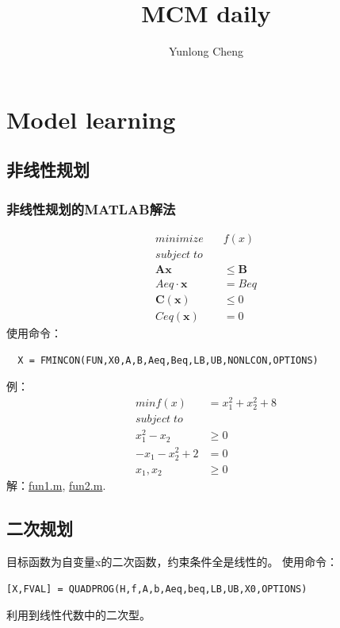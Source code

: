\documentclass[12pt,a4paper]{article}
\title{MCM daily}
\author{Yunlong Cheng}
\begin{document}
\maketitle

\section{Model learning}
\subsection{非线性规划}
\subsubsection{非线性规划的MATLAB解法}

\begin{equation*}
  \begin{split}
    minimize\quad & f(x)\\
    subject\;to &\\
    \mathbf{Ax}& \le \mathbf{B}\\
    Aeq \cdot \mathbf{x}& = Beq\\
    \mathbf{C(x)}& \le 0\\
    Ceq(\mathbf{x})& = 0
  \end{split}
\end{equation*}
使用命令：
\begin{lstlisting}
  X = FMINCON(FUN,X0,A,B,Aeq,Beq,LB,UB,NONLCON,OPTIONS)
\end{lstlisting}
例：
\begin{equation*}
  \begin{split}
    min f(x)& = x_1^2+x_2^2+8\\
    subject\;to&\\
    x_1^2-x_2& \ge 0\\
    -x_1-x_2^2+2& = 0\\
    x_1, x_2& \ge 0
  \end{split}
\end{equation*}
解：\href{run:matlab/fun1.m}{fun1.m}, \href{run:matlab/fun2.m}{fun2.m}.

\subsection{二次规划}
目标函数为自变量x的二次函数，约束条件全是线性的。
使用命令：
\begin{lstlisting}
[X,FVAL] = QUADPROG(H,f,A,b,Aeq,beq,LB,UB,X0,OPTIONS)
\end{lstlisting}
利用到线性代数中的二次型。
\end{document}
